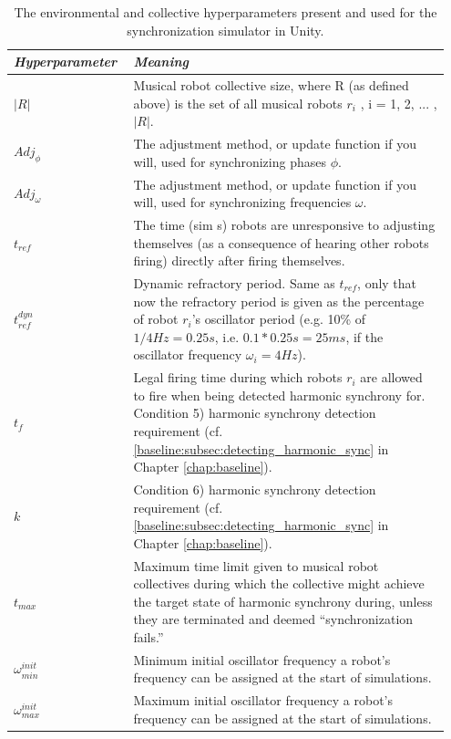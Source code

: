 	
	\begin{table}[ht]
		\centering
		\begin{tabular}{p{0.25\linewidth} | p{0.7\linewidth}}
		  \textit{\textbf{Hyperparameter}}  & \textit{\textbf{Meaning}} \\ \hline
		  $|R|$ & Musical robot collective size, where R (as defined above) is the set of all musical robots $r_i$ , i = 1, 2, ... , $|R|$. \\ \hline
		  $Adj_{\phi}$ & The adjustment method, or update function if you will, used for synchronizing phases $\phi$. \\ \hline
		  $Adj_{\omega}$ & The adjustment method, or update function if you will, used for synchronizing frequencies $\omega$. \\ \hline
		  $t_{ref} $ & The time (sim s) robots are unresponsive to adjusting themselves (as a consequence of hearing other robots firing) directly after firing themselves. \\ \hline
		  $t_{ref}^{dyn}$ & Dynamic refractory period. Same as $t_{ref}$, only that now the refractory period is given as the percentage of robot $r_i$'s oscillator period (e.g. 10\% of $1/4Hz=0.25s$, i.e. $0.1*0.25s=25ms$, if the oscillator frequency $\omega_i=4Hz$). \\ \hline
		  $t_f$ & Legal firing time during which robots $r_i$ are allowed to fire when being detected harmonic synchrony for. Condition 5) harmonic synchrony detection requirement (cf. \ref{baseline:subsec:detecting_harmonic_sync} in Chapter \ref{chap:baseline}). \\ \hline
		  $k$ & Condition 6) harmonic synchrony detection requirement (cf. \ref{baseline:subsec:detecting_harmonic_sync} in Chapter \ref{chap:baseline}). \\ \hline
		  $t_{max}$ & Maximum time limit given to musical robot collectives during which the collective might achieve the target state of harmonic synchrony during, unless they are terminated and deemed ``synchronization fails.'' \\ \hline
		  $\omega_{min}^{init}$ & Minimum initial oscillator frequency a robot's frequency can be assigned at the start of simulations. \\ \hline
		  $\omega_{max}^{init}$ & Maximum initial oscillator frequency a robot's frequency can be assigned at the start of simulations.
		\end{tabular}
		\caption{The environmental and collective hyperparameters present and used for the synchronization simulator in Unity.}
		\label{tab:synchrony_simulator_hyperparameters}
	\end{table}
	
